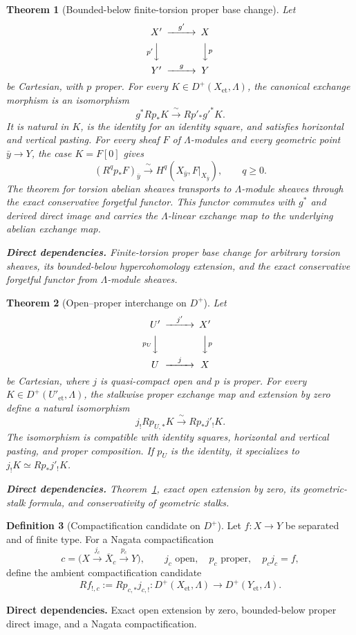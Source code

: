 \documentclass[10pt]{article}
\newtheorem{theorem}{Theorem}[section]
\theoremstyle{definition}
\newtheorem{definition}[theorem]{Definition}
\newcommand{\deps}[1]{\par\smallskip\noindent\textbf{Direct dependencies.} #1}
\begin{document}
\begin{theorem}[Bounded-below finite-torsion proper base change]
\label{thm:ambient-proper-bc}
Let
\[
\begin{CD}
 X'@>{g'}>>X\\
 @V{p'}VV @VV{p}V\\
 Y'@>{g}>>Y
\end{CD}
\]
be Cartesian, with $p$ proper.  For every
$K\in D^+(X_{\mathrm{et}},\Lambda)$, the canonical exchange morphism is an
isomorphism
\[
 g^*Rp_*K\xrightarrow{\ \sim\ }Rp'_*g'^*K.
\]
It is natural in $K$, is the identity for an identity square, and satisfies
horizontal and vertical pasting.  For every sheaf $F$ of $\Lambda$-modules
and every geometric point $\bar y\to Y$, the case $K=F[0]$ gives
\[
 (R^qp_*F)_{\bar y}\xrightarrow{\ \sim\ }
 H^q(X_{\bar y},F|_{X_{\bar y}}),
 \qquad q\geq0.
\]
The theorem for torsion abelian sheaves transports to $\Lambda$-module
sheaves through the exact conservative forgetful functor.  This functor
commutes with $g^*$ and derived direct image and carries the $\Lambda$-linear
exchange map to the underlying abelian exchange map.
\deps{Finite-torsion proper base change for arbitrary torsion sheaves, its
bounded-below hypercohomology extension, and the exact conservative forgetful
functor from $\Lambda$-module sheaves.}
\end{theorem}

\begin{theorem}[Open--proper interchange on $D^+$]
\label{thm:open-proper-interchange}
Let
\[
\begin{CD}
 U'@>{j'}>>X'\\
 @V{p_U}VV @VV{p}V\\
 U@>{j}>>X
\end{CD}
\]
be Cartesian, where $j$ is quasi-compact open and $p$ is proper.  For every
$K\in D^+(U'_{\mathrm{et}},\Lambda)$, the stalkwise proper exchange map and
extension by zero define a natural isomorphism
\[
 j_!Rp_{U,*}K\xrightarrow{\ \sim\ }Rp_*j'_!K.
\]
The isomorphism is compatible with identity squares, horizontal and vertical
pasting, and proper composition.  If $p_U$ is the identity, it specializes to
$j_!K\simeq Rp_*j'_!K$.
\deps{Theorem~\ref{thm:ambient-proper-bc}, exact open extension by zero, its
geometric-stalk formula, and conservativity of geometric stalks.}
\end{theorem}

\begin{definition}[Compactification candidate on $D^+$]
Let $f:X\to Y$ be separated and of finite type.  For a Nagata
compactification
\[
 c=\bigl(X\xrightarrow{j_c}\overline X_c\xrightarrow{p_c}Y\bigr),
 \qquad j_c\text{ open},\quad p_c\text{ proper},\quad p_cj_c=f,
\]
define the ambient compactification candidate
\[
 Rf_{!,c}:=Rp_{c,*}j_{c,!}:
 D^+(X_{\mathrm{et}},\Lambda)\longrightarrow
 D^+(Y_{\mathrm{et}},\Lambda).
\]
\deps{Exact open extension by zero, bounded-below proper direct image, and a
Nagata compactification.}
\end{definition}
\end{document}
